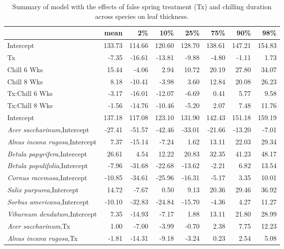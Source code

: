 \documentclass{article}\usepackage[]{graphicx}\usepackage[]{color}
\begin{document}
\newpage
\begin{longtable}{lrrrrrrr}
\caption{Summary of model with the effects of false spring treatment (Tx) and chilling duration across species on leaf thickness.} \\ 
  \hline
 & mean & 2\% & 10\% & 25\% & 75\% & 90\% & 98\% \\ 
  \hline \endhead  \hline
Intercept & 133.73 & 114.66 & 120.60 & 128.70 & 138.61 & 147.21 & 154.83 \\ 
  Tx & -7.35 & -16.61 & -13.81 & -9.88 & -4.80 & -1.11 & 1.73 \\ 
  Chill 6 Wks & 15.44 & -4.06 & 2.94 & 10.72 & 20.19 & 27.80 & 34.07 \\ 
  Chill 8 Wks & 8.18 & -10.41 & -3.98 & 3.60 & 12.84 & 20.08 & 26.23 \\ 
  Tx:Chill 6 Wks & -3.17 & -16.01 & -12.07 & -6.69 & 0.41 & 5.77 & 9.58 \\ 
  Tx:Chill 8 Wks & -1.56 & -14.76 & -10.46 & -5.20 & 2.07 & 7.48 & 11.76 \\ 
  Intercept & 137.18 & 117.08 & 123.10 & 131.90 & 142.43 & 151.18 & 159.19 \\ 
  \textit{Acer saccharinum},Intercept & -27.41 & -51.57 & -42.46 & -33.01 & -21.66 & -13.20 & -7.01 \\ 
  \textit{Alnus incana rugosa},Intercept & 7.37 & -15.14 & -7.24 & 1.62 & 13.11 & 22.03 & 29.34 \\ 
  \textit{Betula papyrifera},Intercept & 26.61 & 4.54 & 12.22 & 20.83 & 32.35 & 41.23 & 48.17 \\ 
  \textit{Betula populifolia},Intercept & -7.96 & -31.68 & -22.68 & -13.62 & -2.21 & 6.82 & 13.54 \\ 
  \textit{Cornus racemosa},Intercept & -10.85 & -34.61 & -25.96 & -16.31 & -5.17 & 3.35 & 10.01 \\ 
  \textit{Salix purpurea},Intercept & 14.72 & -7.67 & 0.50 & 9.13 & 20.36 & 29.46 & 36.92 \\ 
  \textit{Sorbus americana},Intercept & -10.10 & -32.83 & -24.84 & -15.70 & -4.36 & 4.27 & 11.27 \\ 
  \textit{Viburnum dendatum},Intercept & 7.35 & -14.93 & -7.17 & 1.88 & 13.11 & 21.80 & 28.99 \\ 
  \textit{Acer saccharinum},Tx & 1.00 & -7.00 & -3.99 & -0.70 & 2.38 & 7.75 & 12.23 \\ 
  \textit{Alnus incana rugosa},Tx & -1.81 & -14.31 & -9.18 & -3.24 & 0.23 & 2.54 & 5.08 \\ 

\end{longtable}
\end{document}
